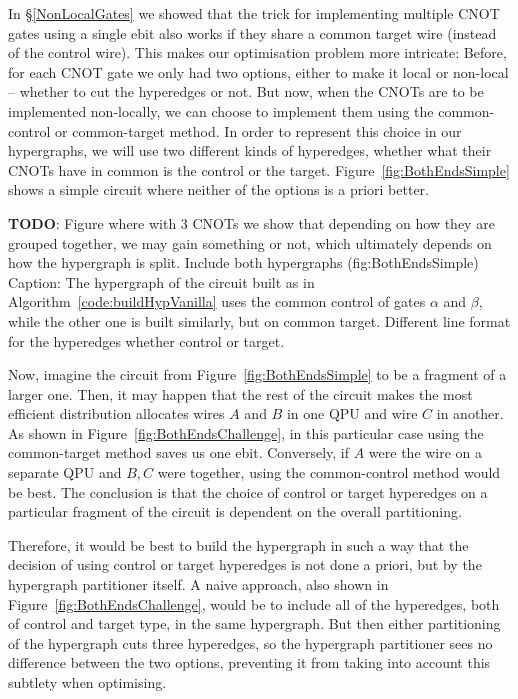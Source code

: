 In \S\ref{NonLocalGates} we showed that the trick for implementing multiple CNOT gates using a single ebit also works if they share a common target wire (instead of the control wire). This makes our optimisation problem more intricate: Before, for each CNOT gate we only had two options, either to make it local or non-local -- whether to cut the hyperedges or not. But now, when the CNOTs are to be implemented non-locally, we can choose to implement them using the common-control or common-target method. In order to represent this choice in our hypergraphs, we will use two different kinds of hyperedges, whether what their CNOTs have in common is the control or the target. Figure~\ref{fig:BothEndsSimple} shows a simple circuit where neither of the options is a priori better. 

\textbf{TODO}: Figure where with 3 CNOTs we show that depending on how they are grouped together, we may gain something or not, which ultimately depends on how the hypergraph is split. Include both hypergraphs (fig:BothEndsSimple) Caption: The hypergraph of the circuit built as in Algorithm~\ref{code:buildHypVanilla} uses the common control of gates \(\alpha\) and \(\beta\), while the other one is built similarly, but on common target. Different line format for the hyperedges whether control or target.

Now, imagine the circuit from Figure~\ref{fig:BothEndsSimple} to be a fragment of a larger one. Then, it may happen that the rest of the circuit makes the most efficient distribution allocates wires \(A\) and \(B\) in one QPU and wire \(C\) in another. As shown in Figure~\ref{fig:BothEndsChallenge}, in this particular case using the common-target method saves us one ebit. Conversely, if \(A\) were the wire on a separate QPU and \(B,C\) were together, using the common-control method would be best. The conclusion is that the choice of control or target hyperedges on a particular fragment of the circuit is dependent on the overall partitioning. 

Therefore, it would be best to build the hypergraph in such a way that the decision of using control or target hyperedges is not done a priori, but by the hypergraph partitioner itself. A naive approach, also shown in Figure~\ref{fig:BothEndsChallenge}, would be to include all of the hyperedges, both of control and target type, in the same hypergraph. But then either partitioning of the hypergraph cuts three hyperedges, so the hypergraph partitioner sees no difference between the two options, preventing it from taking into account this subtlety when optimising.

